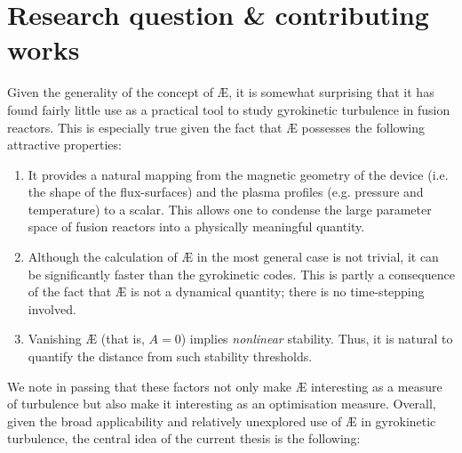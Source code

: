 \section{Research question \& contributing works}
Given the generality of the concept of \AE{}, it is somewhat surprising that it has found fairly little use as a practical tool to study gyrokinetic turbulence in fusion reactors. This is especially true given the fact that \AE{} possesses the following attractive properties:
\begin{enumerate}
    \item It provides a natural mapping from the magnetic geometry of the device (i.e. the shape of the flux-surfaces) and the plasma profiles (e.g. pressure and temperature) to a scalar. This allows one to condense the large parameter space of fusion reactors into a physically meaningful quantity.
    \item Although the calculation of \AE{} in the most general case is not trivial, it can be significantly faster than the gyrokinetic codes. This is partly a consequence of the fact that \AE{} is not a dynamical quantity; there is no time-stepping involved.
    \item Vanishing \AE{} (that is, $A = 0$) implies \textit{ nonlinear} stability. Thus, it is natural to quantify the distance from such stability thresholds.
\end{enumerate}
We note in passing that these factors not only make \AE{} interesting as a measure of turbulence but also make it interesting as an optimisation measure. Overall, given the broad applicability and relatively unexplored use of \AE{} in gyrokinetic turbulence, the central idea of the current thesis is the following:

